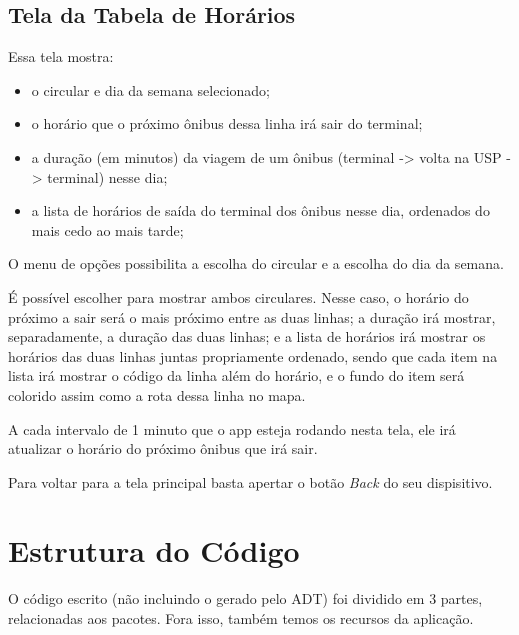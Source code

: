 \subsection{Tela da Tabela de Horários}
Essa tela mostra:
\begin{itemize}
    \item o circular e dia da semana selecionado;
    \item o horário que o próximo ônibus dessa linha irá sair do terminal;
    \item a duração (em minutos) da viagem de um ônibus (terminal -> volta na USP -> terminal) nesse dia;
    \item a lista de horários de saída do terminal dos ônibus nesse dia, ordenados do mais cedo ao mais tarde;
\end{itemize}

O menu de opções possibilita a escolha do circular e a escolha do dia da semana.

É possível escolher para mostrar ambos circulares. Nesse caso, o horário do próximo a sair será o mais próximo
entre as duas linhas; a duração irá mostrar, separadamente, a duração das duas linhas; e a lista de horários
irá mostrar os horários das duas linhas juntas propriamente ordenado, sendo que cada item na lista irá mostrar o
código da linha além do horário, e o fundo do item será colorido assim como a rota dessa linha no mapa.

A cada intervalo de 1 minuto que o app esteja rodando nesta tela, ele irá atualizar o horário do próximo ônibus
que irá sair.

Para voltar para a tela principal basta apertar o botão \textit{Back} do seu dispisitivo.

\section{Estrutura do Código}
O código escrito (não incluindo o gerado pelo ADT) foi dividido
em 3 partes, relacionadas aos pacotes. Fora isso, também temos os
recursos da aplicação.

